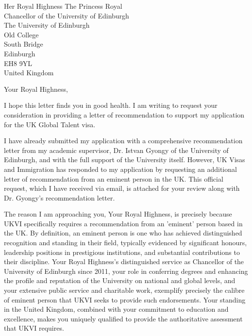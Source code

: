 \documentclass[12pt,a4paper]{letter}
\begin{document}
\begin{letter}{Her Royal Highness The Princess Royal\\Chancellor of the University of Edinburgh\\The University of Edinburgh\\Old College\\South Bridge\\Edinburgh\\EH8 9YL\\United Kingdom}

\date{\today}

\opening{Your Royal Highness,}

I hope this letter finds you in good health. I am writing to request your consideration in providing a letter of recommendation to support my application for the UK Global Talent visa.

I have already submitted my application with a comprehensive recommendation letter from my academic supervisor, Dr. Istvan Gyongy of the University of Edinburgh, and with the full support of the University itself. However, UK Visas and Immigration has responded to my application by requesting an additional letter of recommendation from an eminent person in the UK. This official request, which I have received via email, is attached for your review along with Dr. Gyongy's recommendation letter.

The reason I am approaching you, Your Royal Highness, is precisely because UKVI specifically requires a recommendation from an 'eminent' person based in the UK. By definition, an eminent person is one who has achieved distinguished recognition and standing in their field, typically evidenced by significant honours, leadership positions in prestigious institutions, and substantial contributions to their discipline. Your Royal Highness's distinguished service as Chancellor of the University of Edinburgh since 2011, your role in conferring degrees and enhancing the profile and reputation of the University on national and global levels, and your extensive public service and charitable work, exemplify precisely the calibre of eminent person that UKVI seeks to provide such endorsements. Your standing in the United Kingdom, combined with your commitment to education and excellence, makes you uniquely qualified to provide the authoritative assessment that UKVI requires.


\end{letter}
\end{document}
